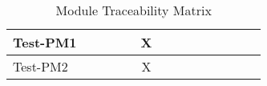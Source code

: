 \documentclass[12pt, titlepage]{article}
\begin{document}
\begin{table}[H]
\begin{adjustwidth}{-0.3in}{-0.5in}
{\begin{tabular}{c|c|c|c|c|c|c|c|c|c|c|c|c|c|}
\multicolumn{1}{|l|}{{Test-PM1}}   &             &             &             &             &    X         &             &                          &              &              &              &             &  &                    \\ \hline
\multicolumn{1}{|l|}{{Test-PM2}}   &             &             &             &             &      X       &             &                          &              &              &              &             &  &                    \\ \hline
\end{tabular}}
\caption{Module Traceability Matrix}
    \label{tab:matrix4}
\end{adjustwidth}
\end{table}


\begin{table}[H]
\centering
\begin{adjustwidth}{-0.3in}{-0.5in}
\end{adjustwidth}
\end{table}
\end{document}
